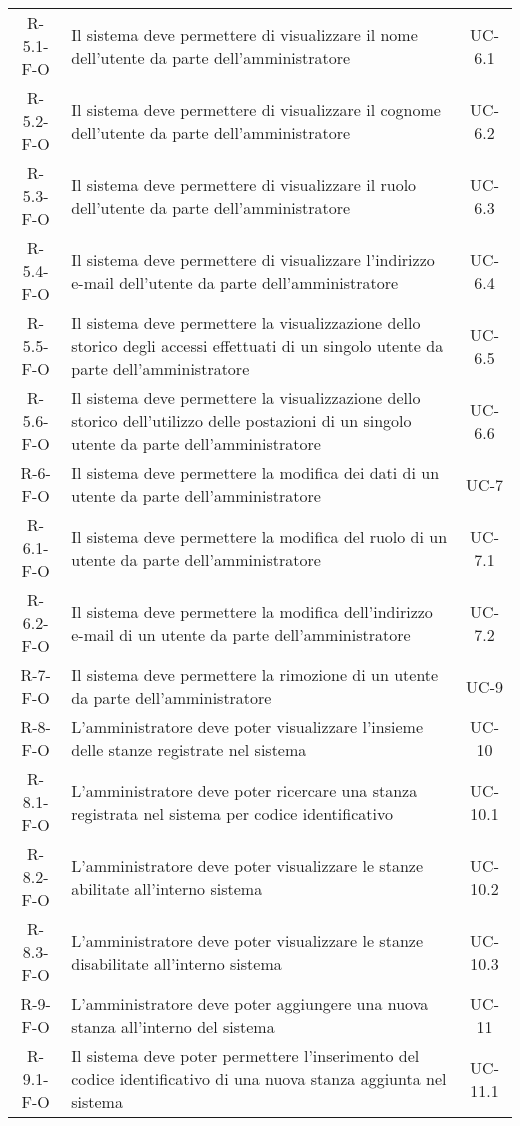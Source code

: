 \begin{longtable}{ c C{9.5cm} c }
    R-5.1-F-O & Il sistema deve permettere di visualizzare il nome dell'utente da parte dell'amministratore& UC-6.1 \\
    R-5.2-F-O & Il sistema deve permettere di visualizzare il cognome dell'utente da parte dell'amministratore& UC-6.2 \\
    R-5.3-F-O & Il sistema deve permettere di visualizzare il ruolo dell'utente da parte dell'amministratore& UC-6.3 \\
    R-5.4-F-O & Il sistema deve permettere di visualizzare l'indirizzo e-mail dell'utente da parte dell'amministratore& UC-6.4 \\
    R-5.5-F-O & Il sistema deve permettere la visualizzazione dello storico degli accessi effettuati di un singolo utente da parte dell'amministratore& UC-6.5 \\
    R-5.6-F-O & Il sistema deve permettere la visualizzazione dello storico dell'utilizzo delle postazioni di un singolo utente da parte dell'amministratore& UC-6.6 \\
    R-6-F-O & Il sistema deve permettere la modifica dei dati di un utente da parte dell'amministratore& UC-7 \\
    R-6.1-F-O & Il sistema deve permettere la modifica del ruolo di un utente da parte dell'amministratore& UC-7.1 \\
    R-6.2-F-O & Il sistema deve permettere la modifica dell'indirizzo e-mail di un utente da parte dell'amministratore& UC-7.2 \\
    R-7-F-O & Il sistema deve permettere la rimozione di un utente da parte dell'amministratore& UC-9 \\
    R-8-F-O & L'amministratore deve poter visualizzare l'insieme delle stanze registrate nel sistema& UC- 10\\
    R-8.1-F-O & L'amministratore deve poter ricercare una stanza registrata nel sistema per codice identificativo& UC- 10.1\\
    R-8.2-F-O & L'amministratore deve poter visualizzare le stanze abilitate all'interno sistema& UC- 10.2\\
    R-8.3-F-O & L'amministratore deve poter visualizzare le stanze disabilitate all'interno sistema& UC- 10.3\\
    R-9-F-O &  L'amministratore deve poter aggiungere una nuova stanza all'interno del sistema& UC- 11\\
    R-9.1-F-O & Il sistema deve poter permettere l'inserimento del codice identificativo di una nuova stanza aggiunta nel sistema& UC- 11.1\\

\end{longtable}
